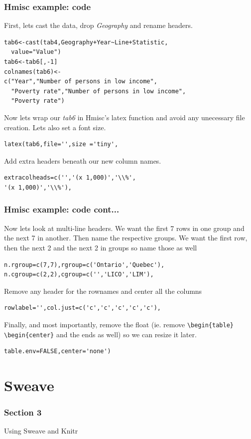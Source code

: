 \documentclass[nogin]{beamer}\usepackage[]{graphicx}\usepackage[]{color}
\begin{document}
\begin{frame}[fragile]
\frametitle{Hmisc example: code}
\small
First, lets cast the data, drop \emph{Geography} and rename headers.
\begin{verbatim}
tab6<-cast(tab4,Geography+Year~Line+Statistic,
  value="Value")
tab6<-tab6[,-1]
colnames(tab6)<-
c("Year","Number of persons in low income",
  "Poverty rate","Number of persons in low income",
  "Poverty rate")
\end{verbatim}
Now lets wrap our \emph{tab6} in Hmisc's latex function and avoid any unecessary file creation. Lets also set a font size.
\begin{verbatim}
latex(tab6,file='',size ='tiny',
\end{verbatim}
Add extra headers beneath our new column names.
\begin{verbatim}
extracolheads=c('','(x 1,000)','\\%',
'(x 1,000)','\\%'),
\end{verbatim}
\end{frame}

\begin{frame}[fragile]
\frametitle{Hmisc example: code cont...}
\small
Now lets look at multi-line headers. We want the first 7 rows in one group and the next 7 in another. Then name the respective groups. We want the first row, then the next 2 and the next 2 in groups so name those as well
\begin{verbatim}
n.rgroup=c(7,7),rgroup=c('Ontario','Quebec'),
n.cgroup=c(2,2),cgroup=c('','LICO','LIM'),
\end{verbatim}
Remove any header for the rownames and center all the columns
\begin{verbatim}
rowlabel='',col.just=c('c','c','c','c','c'),
\end{verbatim}
Finally, and most importantly, remove the float (ie. remove \verb|\begin{table} \begin{center}| and the ends as well) so we can resize it later.
\begin{verbatim}
table.env=FALSE,center='none')
\end{verbatim}
\end{frame}




\section{Sweave}
\begin{frame}
\frametitle{Section 3}
\begin{center}
\Large
Using Sweave and Knitr
\end{center}
\end{frame}
\end{document}
